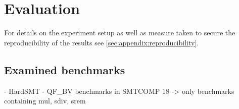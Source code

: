 \chapter{Evaluation}
\label{ch:evaluation}
For details on the experiment setup as well as measure taken to secure the reproducibility of the results see \ref{sec:appendix:reproducibility}.
\section{Examined benchmarks}
- HardSMT
- QF\_BV benchmarks in SMTCOMP 18 -> only benchmarks containing mul, sdiv, srem